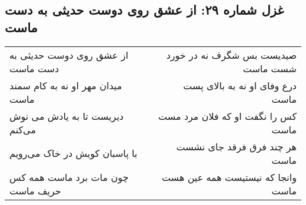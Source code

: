 \begin{center}
\section*{غزل شماره ۲۹: از عشق روی دوست حدیثی به دست ماست}
\label{sec:029}
\begin{longtable}{l p{0.5cm} r}
از عشق روی دوست حدیثی به دست ماست
&&
صیدیست بس شگرف نه در خورد شست ماست
\\
میدان مهر او نه به کام سمند ماست
&&
درع وفای او نه به بالای پست ماست
\\
دیریست تا به یادش می نوش می‌کنم
&&
کس را نگفت او که فلان مرد مست ماست
\\
با پاسبان کویش در خاک می‌رویم
&&
هر چند فرق فرقد جای نشست ماست
\\
چون مات برد ماست همه کس حریف ماست
&&
وانجا که نیستیست همه عین هست ماست
\\
\end{longtable}
\end{center}
